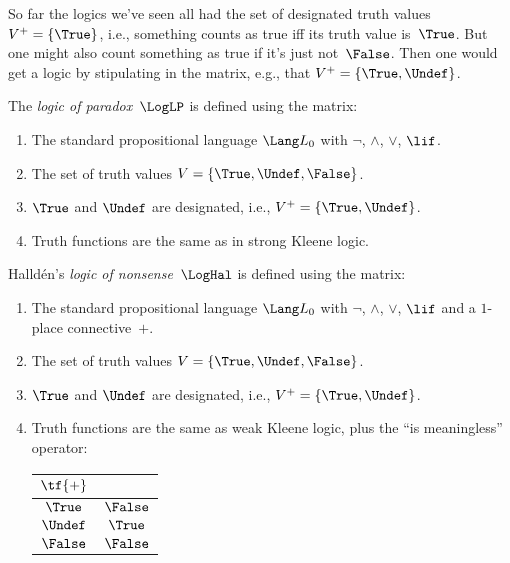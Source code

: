\documentclass[../../../include/open-logic-section]{subfiles}
\begin{document}


So far the logics we've seen all had the set of designated truth
values $V^+ = \{\True\}$, i.e., something counts as true iff its truth
value is~$\True$.  But one might also count something as true if it's
just not~$\False$. Then one would get a logic by stipulating in the
matrix, e.g., that $V^+ = \{\True, \Undef\}$.

\begin{defn}
The \emph{logic of paradox}~$\LogLP$ is defined using the matrix:
\begin{enumerate}
  \item The standard propositional language $\Lang L_0$ with
  $\lnot$, $\land$, $\lor$, $\lif$.
  \item The set of truth values $V = \{\True, \Undef, \False\}$.
  \item $\True$ and $\Undef$ are designated, i.e., $V^+ = \{\True, \Undef\}$.
  \item Truth functions are the same as in strong Kleene logic.
\end{enumerate}
\end{defn}

\begin{defn}
Halld\'en's \emph{logic of nonsense}~$\LogHal$ is defined using the matrix:
\begin{enumerate}
  \item The standard propositional language $\Lang L_0$ with
  $\lnot$, $\land$, $\lor$, $\lif$ and a $1$-place connective~$+$.
  \item The set of truth values $V = \{\True, \Undef, \False\}$.
  \item $\True$ and $\Undef$ are designated, i.e., $V^+ = \{\True, \Undef\}$.
  \item Truth functions are the same as weak Kleene logic, plus the
  ``is meaningless'' operator:
  \begin{center}
    \begin{tabular}{c|c} 
    $\tf{+}$ & \\ 
    \hline  
    $\True$ & $\False$ \\ 
    $\Undef$ & $\True$ \\
    $\False$ & $\False$ 
    \end{tabular}
  \end{center}
\end{enumerate}
\end{defn}
\end{document}
